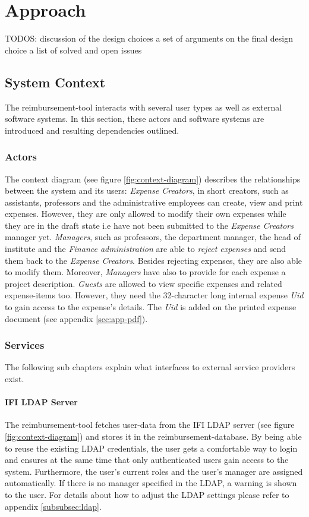 \chapter{Approach}

TODOS:
 discussion of the design choices  a set of arguments on the final design choice
 a list of solved and open issues




\section{System Context}

The reimbursement-tool interacts with several user types as well as external software systems. In this section, these actors and software systems are introduced and resulting dependencies outlined.

\subsection{Actors}

The context diagram (see figure \ref{fig:context-diagram}) describes the relationships between the system and its users:
 \textit{Expense Creators}, in short creators, such as assistants, professors and the administrative employees can create, view and print expenses. However, they are only allowed to modify their own expenses while they are in the draft state i.e have not been submitted to the \textit{Expense Creators} manager yet.  \textit{Managers}, such as professors, the department manager, the head of institute and the \textit{Finance administration} are able to \textit{reject expenses} and send them back to the \textit{Expense Creators}. Besides rejecting expenses, they are also able to modify them. Moreover, \textit{Managers} have also to provide for each expense a project description. \textit{Guests} are allowed to view specific expenses and related expense-items too. However, they need the 32-character long internal expense \textit{Uid} to gain access to the expense's details. The \textit{Uid} is added on the printed expense document (see appendix \ref{sec:app-pdf}).

\subsection{Services}
The following sub chapters explain what interfaces to external service providers exist.

\subsubsection{IFI LDAP Server}
The reimbursement-tool fetches user-data from the IFI LDAP server (see figure \ref{fig:context-diagram}) and stores it in the reimbursement-database. By being able to reuse the existing LDAP credentials, the user gets a comfortable way to login and ensures at the same time that only authenticated users gain access to the system. Furthermore, the user's current roles and the user's manager are assigned automatically. If there is no manager specified in the LDAP, a warning is shown to the user. For details about how to adjust the LDAP settings please refer to appendix \ref{subsubsec:ldap}.

